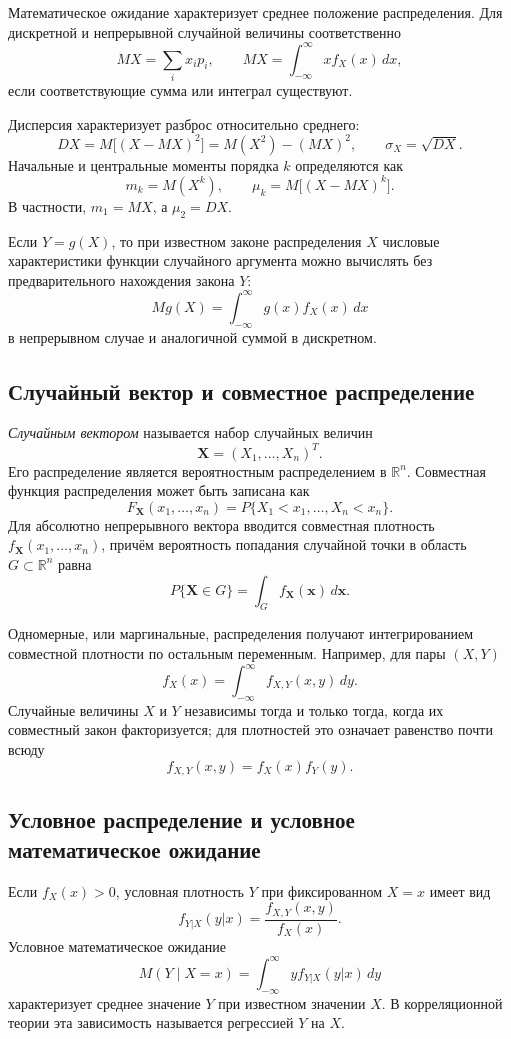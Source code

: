 Математическое ожидание характеризует среднее положение распределения. Для
дискретной и непрерывной случайной величины соответственно
\[
    M X=\sum_i x_i p_i,
    \qquad
    M X=\int_{-\infty}^{\infty}x f_X(x)\,dx,
\]
если соответствующие сумма или интеграл существуют.

Дисперсия характеризует разброс относительно среднего:
\[
    D X=M\bigl[(X-MX)^2\bigr]
       =M(X^2)-(MX)^2,
    \qquad
    \sigma_X=\sqrt{DX}.
\]
Начальные и центральные моменты порядка $k$ определяются как
\[
    m_k=M(X^k),\qquad
    \mu_k=M\bigl[(X-MX)^k\bigr].
\]
В частности, $m_1=MX$, а $\mu_2=DX$.

Если $Y=g(X)$, то при известном законе распределения $X$ числовые
характеристики функции случайного аргумента можно вычислять без предварительного
нахождения закона $Y$:
\[
    M g(X)=\int_{-\infty}^{\infty}g(x)f_X(x)\,dx
\]
в непрерывном случае и аналогичной суммой в дискретном.

\subsection{Случайный вектор и совместное распределение}

\emph{Случайным вектором} называется набор случайных величин
\[
    \mathbf X=(X_1,\ldots,X_n)^T.
\]
Его распределение является вероятностным распределением в $\mathbb R^n$.
Совместная функция распределения может быть записана как
\[
    F_{\mathbf X}(x_1,\ldots,x_n)
    =P\{X_1<x_1,\ldots,X_n<x_n\}.
\]
Для абсолютно непрерывного вектора вводится совместная плотность
$f_{\mathbf X}(x_1,\ldots,x_n)$, причём вероятность попадания случайной точки
в область $G\subset\mathbb R^n$ равна
\[
    P\{\mathbf X\in G\}
    =\int_G f_{\mathbf X}(\mathbf x)\,d\mathbf x.
\]

Одномерные, или маргинальные, распределения получают интегрированием совместной
плотности по остальным переменным. Например, для пары $(X,Y)$
\[
    f_X(x)=\int_{-\infty}^{\infty}f_{X,Y}(x,y)\,dy.
\]
Случайные величины $X$ и $Y$ независимы тогда и только тогда, когда их
совместный закон факторизуется; для плотностей это означает равенство почти всюду
\[
    f_{X,Y}(x,y)=f_X(x)f_Y(y).
\]

\subsection{Условное распределение и условное математическое ожидание}

Если $f_X(x)>0$, условная плотность $Y$ при фиксированном $X=x$ имеет вид
\[
    f_{Y|X}(y|x)=\frac{f_{X,Y}(x,y)}{f_X(x)}.
\]
Условное математическое ожидание
\[
    M(Y\mid X=x)=\int_{-\infty}^{\infty}y f_{Y|X}(y|x)\,dy
\]
характеризует среднее значение $Y$ при известном значении $X$. В корреляционной
теории эта зависимость называется регрессией $Y$ на $X$.

